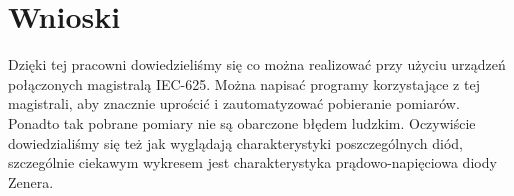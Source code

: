 \documentclass[a4paper,11pt]{article}
\begin{document}
\section{Wnioski}

Dzięki tej pracowni dowiedzieliśmy się co można realizować przy użyciu urządzeń połączonych magistralą IEC-625. Można napisać programy korzystające z tej magistrali, aby znacznie uprościć  i zautomatyzować pobieranie pomiarów. Ponadto tak pobrane pomiary nie są obarczone błędem ludzkim. Oczywiście dowiedzialiśmy się też jak wyglądają charakterystyki poszczególnych diód, szczególnie ciekawym wykresem jest charakterystyka prądowo-napięciowa diody Zenera.
\end{document}
